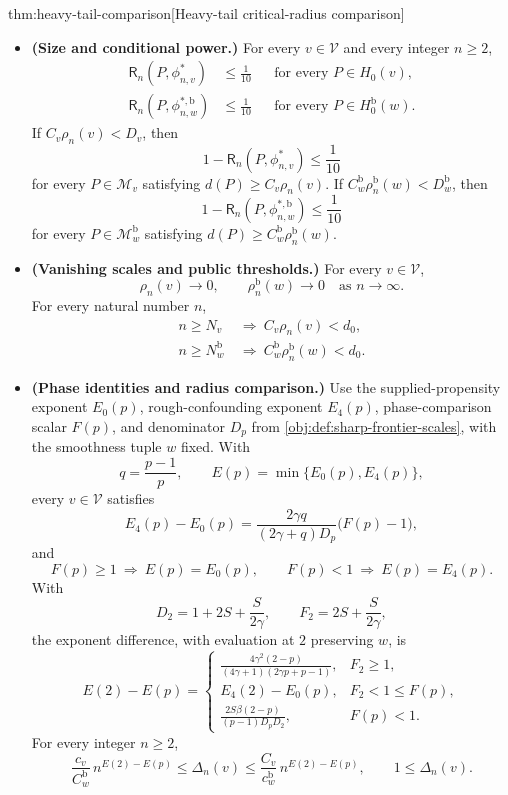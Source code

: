 \begin{theoremv}{thm:heavy-tail-comparison}[Heavy-tail critical-radius comparison]
\begin{itemize}
\item \textbf{(Size and conditional power.)}
For every \(v\in\mathcal V\) and every integer \(n\ge2\),
\[
\begin{aligned}
\mathsf R_n(P,\phi^*_{n,v})&\le\frac1{10}
&&\text{for every }P\in H_0(v),\\
\mathsf R_n(P,\phi^{*,\mathrm b}_{n,w})&\le\frac1{10}
&&\text{for every }P\in H_0^{\mathrm b}(w).
\end{aligned}
\]
If \(C_v\rho_n(v)<D_v\), then
\[
1-\mathsf R_n(P,\phi^*_{n,v})\le\frac1{10}
\]
for every \(P\in\mathcal M_v\) satisfying \(d(P)\ge C_v\rho_n(v)\).
If \(C_w^{\mathrm b}\rho_n^{\mathrm b}(w)<D_w^{\mathrm b}\), then
\[
1-\mathsf R_n(P,\phi^{*,\mathrm b}_{n,w})\le\frac1{10}
\]
for every \(P\in\mathcal M^{\mathrm b}_w\) satisfying
\(d(P)\ge C_w^{\mathrm b}\rho_n^{\mathrm b}(w)\).

\item \textbf{(Vanishing scales and public thresholds.)}
For every \(v\in\mathcal V\),
\[
\rho_n(v)\longrightarrow0,
\qquad
\rho_n^{\mathrm b}(w)\longrightarrow0
\quad\text{as }n\longrightarrow\infty.
\]
For every natural number \(n\),
\[
\begin{aligned}
n\ge N_v
&\ \Longrightarrow\ C_v\rho_n(v)<d_0,\\
n\ge N_w^{\mathrm b}
&\ \Longrightarrow\ C_w^{\mathrm b}\rho_n^{\mathrm b}(w)<d_0.
\end{aligned}
\]

\item \textbf{(Phase identities and radius comparison.)}
Use the supplied-propensity exponent \(E_0(p)\), rough-confounding exponent \(E_4(p)\), phase-comparison scalar \(F(p)\), and denominator \(D_p\) from \cref{obj:def:sharp-frontier-scales}, with the smoothness tuple \(w\) fixed. With
\[
q=\frac{p-1}{p},
\qquad
E(p)=\min\{E_0(p),E_4(p)\},
\]
every \(v\in\mathcal V\) satisfies
\[
E_4(p)-E_0(p)
=
\frac{2\gamma q}{(2\gamma+q)D_p}\bigl(F(p)-1\bigr),
\]
and
\[
F(p)\ge1\ \Longrightarrow\ E(p)=E_0(p),
\qquad
F(p)<1\ \Longrightarrow\ E(p)=E_4(p).
\]
With
\[
D_2=1+2S+\frac{S}{2\gamma},
\qquad
F_2=2S+\frac{S}{2\gamma},
\]
the exponent difference, with evaluation at \(2\) preserving \(w\), is
\[
E(2)-E(p)=
\begin{cases}
\displaystyle
\frac{4\gamma^2(2-p)}{(4\gamma+1)(2\gamma p+p-1)},
&F_2\ge1,\\[6pt]
\displaystyle E_4(2)-E_0(p),
&F_2<1\le F(p),\\[4pt]
\displaystyle
\frac{2S\beta(2-p)}{(p-1)D_pD_2},
&F(p)<1.
\end{cases}
\]
For every integer \(n\ge2\),
\[
\frac{c_v}{C_w^{\mathrm b}}\,n^{E(2)-E(p)}
\le\Delta_n(v)
\le
\frac{C_v}{c_w^{\mathrm b}}\,n^{E(2)-E(p)},
\qquad
1\le\Delta_n(v).
\]


\end{itemize}
\end{theoremv}
